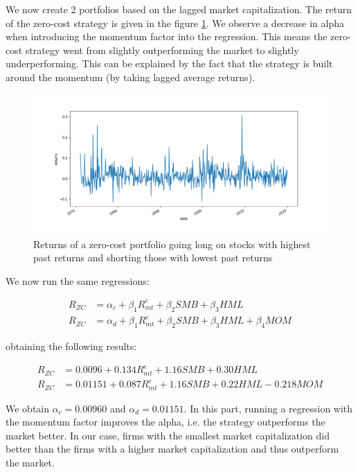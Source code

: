 \documentclass[10pt]{article}
\begin{document}
\bigbreak

We now create 2 portfolios based on the lagged market capitalization. The return
of the zero-cost strategy is given in the figure \ref{ps8_ex2_plot2}. We observe
a decrease in alpha when introducing the momentum factor into the regression.
This means the zero-cost strategy went from slightly outperforming the market to
slightly underperforming. This can be explained by the fact that the strategy is
built around the momentum (by taking lagged average returns).  

\begin{figure}[h]
    \centering
    \includegraphics[scale=0.5]{ps8_ex2_plot2.png}
    \caption{Returns of a zero-cost portfolio going long on stocks with highest
      past returns and shorting those with lowest past returns}
    \label{ps8_ex2_plot2}    
\end{figure}

We now run the same regressions:

\begin{align*}	
	R_{ZC} &= \alpha_c +  \beta_1 R^e_{mt}  + \beta_2 SMB + \beta_3 HML \\
	R_{ZC}  &= \alpha_d + \beta_1 R^e_{mt} + \beta_2 SMB + \beta_3 HML + \beta_4 MOM
\end{align*}

obtaining the following results:

\begin{align*}	
	R_{ZC} &= 0.0096 + 0.134 R^e_{mt}  + 1.16 SMB + 0.30 HML \\
	R_{ZC}  &= 0.01151 + 0.087 R^e_{mt} + 1.16 SMB + 0.22 HML - 0.218 MOM
\end{align*}  


We obtain $\alpha_{c} =  0.00960$ and $\alpha_{d} = 0.01151$. In this part, running a regression with the momentum factor improves the alpha, i.e. the strategy outperforms the market better. In our case, firms with the smallest market capitalization did better than the firms with a higher market capitalization and thus outperform the market. 
\end{document}
